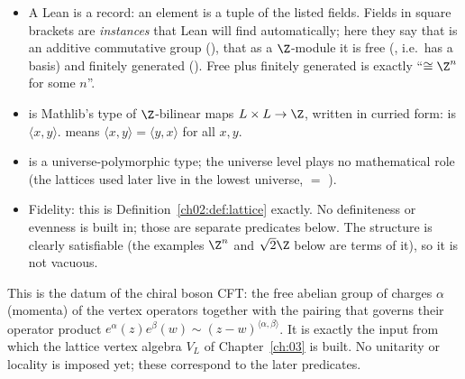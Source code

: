 \begin{dictionary}
\begin{itemize}
\item A Lean  is a record: an element  is a tuple of
  the listed fields.  Fields in square brackets are \emph{instances} that Lean will find
  automatically; here they say that  is an additive commutative group
  (), that as a $\Z$-module it is free (, i.e.\ has a
  basis) and finitely generated ().  Free plus finitely generated is
  exactly ``$\cong\Z^n$ for some $n$''.
\item {} is Mathlib's type of $\Z$-bilinear maps $L\times
  L\to\Z$, written in curried form:  is $\langle x,y\rangle$.
   means $\langle x,y\rangle=\langle y,x\rangle$ for all $x,y$.
\item {} is a universe-polymorphic type; the universe level plays no mathematical
  role (the lattices used later live in the lowest universe,  $=$ ).
\item Fidelity: this is Definition~\ref{ch02:def:lattice} exactly.  No definiteness or
  evenness is built in; those are separate predicates below.  The structure is clearly
  satisfiable (the examples $\Z^n$ and $\sqrt2\Z$ below are terms of it), so it is not vacuous.
\end{itemize}
\end{dictionary}
\begin{physics}
This is the datum of the chiral boson CFT: the free abelian group of charges $\alpha$ (momenta) of the vertex operators together with the pairing that governs their operator product $e^{\alpha}(z)e^{\beta}(w)\sim(z-w)^{\langle\alpha,\beta\rangle}$. It is exactly the input from which the lattice vertex algebra $V_L$ of Chapter~\ref{ch:03} is built. No unitarity or locality is imposed yet; these correspond to the later predicates.
\end{physics}

